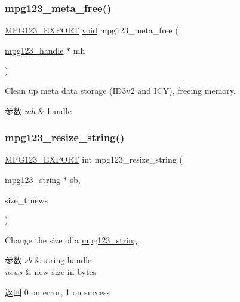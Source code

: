 \subsubsection{\texorpdfstring{mpg123\+\_\+meta\+\_\+free()}{mpg123\_meta\_free()}}
{\footnotesize\ttfamily \hyperlink{mpg123_8h_a2ba98cfba3f760879df70e755b2a61cc}{M\+P\+G123\+\_\+\+E\+X\+P\+O\+RT} \hyperlink{interfacevoid}{void} mpg123\+\_\+meta\+\_\+free (\begin{DoxyParamCaption}\item[{\hyperlink{group__mpg123__init_ga6728e2839a395f3a07d4514da659faca}{mpg123\+\_\+handle} $\ast$}]{mh }\end{DoxyParamCaption})}

Clean up meta data storage (I\+D3v2 and I\+CY), freeing memory. 
\begin{DoxyParams}{参数}
{\em mh} & handle \\
\hline
\end{DoxyParams}
\mbox{\label{group__mpg123__metadata_ga57ddead33785908618a5c0c7f3c1895a}} 
\subsubsection{\texorpdfstring{mpg123\+\_\+resize\+\_\+string()}{mpg123\_resize\_string()}}
{\footnotesize\ttfamily \hyperlink{mpg123_8h_a2ba98cfba3f760879df70e755b2a61cc}{M\+P\+G123\+\_\+\+E\+X\+P\+O\+RT} int mpg123\+\_\+resize\+\_\+string (\begin{DoxyParamCaption}\item[{\hyperlink{structmpg123__string}{mpg123\+\_\+string} $\ast$}]{sb,  }\item[{size\+\_\+t}]{news }\end{DoxyParamCaption})}

Change the size of a \hyperlink{structmpg123__string}{mpg123\+\_\+string} 
\begin{DoxyParams}{参数}
{\em sb} & string handle \\
\hline
{\em news} & new size in bytes \\
\hline
\end{DoxyParams}
\begin{DoxyReturn}{返回}
0 on error, 1 on success 
\end{DoxyReturn}
\mbox{\label{group__mpg123__metadata_ga96e9070d26d63c02c3f22caa0d339f26}} 
